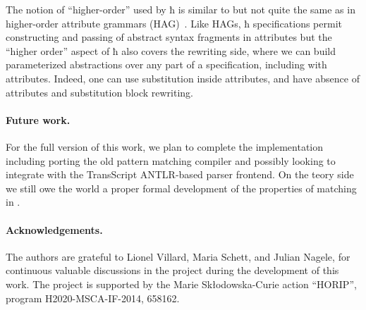 \documentclass[letterpaper,10pt]{proc}
\begin{document}
The notion of ``higher-order'' used by ħ is similar to but not quite the same as in higher-order
attribute grammars (HAG)~\cite{VogtSwierstraKuiper:pldi1989}. Like HAGs, ħ specifications permit
constructing and passing of abstract syntax fragments in attributes but the ``higher order'' aspect
of ħ also covers the rewriting side, where we can build parameterized abstractions over any part
of a specification, including with attributes. Indeed, one can use substitution inside attributes,
and have absence of attributes and substitution block rewriting.

\paragraph*{Future work.}

For the full version of this work, we plan to complete the implementation including porting the old
\CRSX pattern matching compiler and possibly looking to integrate with the TransScript ANTLR-based
parser frontend. On the teory side we still owe the world a proper formal development of the
properties of matching in \plank.

\paragraph*{Acknowledgements.}

The authors are grateful to Lionel Villard, Maria Schett, and Julian Nagele, for continuous valuable
discussions in the \CRSX project during the development of this work.
The project is supported by the Marie Sk{\l}odowska-Curie action ``HORIP'', program
H2020-MSCA-IF-2014, 658162.



\end{document}
